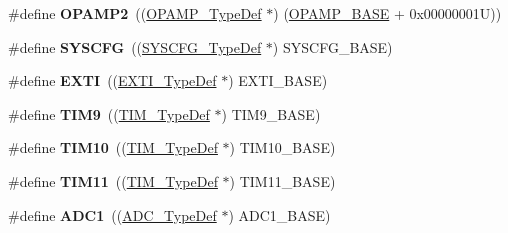 \begin{DoxyCompactItemize}
\item 
\hypertarget{group___peripheral__declaration_gabc11c296d6d15ca861b6378bc056848e}{\#define {\bfseries O\-P\-A\-M\-P2}~((\hyperlink{struct_o_p_a_m_p___type_def}{O\-P\-A\-M\-P\-\_\-\-Type\-Def} $\ast$) (\hyperlink{group___peripheral__memory__map_ga6e9722d15c7ed794f0eca9682f64c03c}{O\-P\-A\-M\-P\-\_\-\-B\-A\-S\-E} + 0x00000001\-U))}\label{group___peripheral__declaration_gabc11c296d6d15ca861b6378bc056848e}

\item 
\hypertarget{group___peripheral__declaration_ga3c833fe1c486cb62250ccbca32899cb8}{\#define {\bfseries S\-Y\-S\-C\-F\-G}~((\hyperlink{struct_s_y_s_c_f_g___type_def}{S\-Y\-S\-C\-F\-G\-\_\-\-Type\-Def} $\ast$) S\-Y\-S\-C\-F\-G\-\_\-\-B\-A\-S\-E)}\label{group___peripheral__declaration_ga3c833fe1c486cb62250ccbca32899cb8}

\item 
\hypertarget{group___peripheral__declaration_ga9189e770cd9b63dadd36683eb9843cac}{\#define {\bfseries E\-X\-T\-I}~((\hyperlink{struct_e_x_t_i___type_def}{E\-X\-T\-I\-\_\-\-Type\-Def} $\ast$) E\-X\-T\-I\-\_\-\-B\-A\-S\-E)}\label{group___peripheral__declaration_ga9189e770cd9b63dadd36683eb9843cac}

\item 
\hypertarget{group___peripheral__declaration_gaf52b4b4c36110a0addfa98059f54a50e}{\#define {\bfseries T\-I\-M9}~((\hyperlink{struct_t_i_m___type_def}{T\-I\-M\-\_\-\-Type\-Def} $\ast$) T\-I\-M9\-\_\-\-B\-A\-S\-E)}\label{group___peripheral__declaration_gaf52b4b4c36110a0addfa98059f54a50e}

\item 
\hypertarget{group___peripheral__declaration_ga46b2ad3f5f506f0f8df0d2ec3e767267}{\#define {\bfseries T\-I\-M10}~((\hyperlink{struct_t_i_m___type_def}{T\-I\-M\-\_\-\-Type\-Def} $\ast$) T\-I\-M10\-\_\-\-B\-A\-S\-E)}\label{group___peripheral__declaration_ga46b2ad3f5f506f0f8df0d2ec3e767267}

\item 
\hypertarget{group___peripheral__declaration_gacfd11ef966c7165f57e2cebe0abc71ad}{\#define {\bfseries T\-I\-M11}~((\hyperlink{struct_t_i_m___type_def}{T\-I\-M\-\_\-\-Type\-Def} $\ast$) T\-I\-M11\-\_\-\-B\-A\-S\-E)}\label{group___peripheral__declaration_gacfd11ef966c7165f57e2cebe0abc71ad}

\item 
\hypertarget{group___peripheral__declaration_ga90d2d5c526ce5c0a551f533eccbee71a}{\#define {\bfseries A\-D\-C1}~((\hyperlink{struct_a_d_c___type_def}{A\-D\-C\-\_\-\-Type\-Def} $\ast$) A\-D\-C1\-\_\-\-B\-A\-S\-E)}\label{group___peripheral__declaration_ga90d2d5c526ce5c0a551f533eccbee71a}


\end{DoxyCompactItemize}
